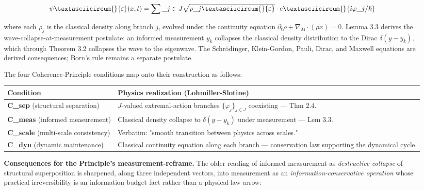 \documentclass[11pt, openany]{book}
\begin{document}
$$
\psi\textasciicircum{}{\varepsilon}(x, t) = \sum\_\allowbreak{}{j \in J} \sqrt{\rho\_\allowbreak{}j\textasciicircum{}{\varepsilon}} \cdot e\textasciicircum{}{i \varphi\_\allowbreak{}j / \hbar}
$$

where each $\rho_j$ is the classical density along branch $j$, evolved under the continuity equation $\partial_t \rho + \nabla_M \cdot (\rho \dot{x}) = 0$. Lemma 3.3 derives the wave-collapse-at-measurement postulate: an informed measurement $y_k$ collapses the classical density distribution to the Dirac $\delta(y - y_k)$, which through Theorem 3.2 collapses the wave to the eigenwave. The Schrödinger, Klein-Gordon, Pauli, Dirac, and Maxwell equations are derived consequences; Born's rule remains a separate postulate.

The four Coherence-Principle conditions map onto their construction as follows:

\begingroup\setlength{\tabcolsep}{3pt}\renewcommand{\arraystretch}{1.15}\footnotesize
\begin{center}
\begin{tabular}{p{1.20in} p{3.19in}}
\toprule
Condition & Physics realization (Lohmiller-Slotine) \\
\midrule
\textbf{C\_\allowbreak{}sep} (structural separation) & $J$-valued extremal-action branches $\{\varphi_j\}_{j \in J}$ coexisting --- Thm 2.4. \\
\textbf{C\_\allowbreak{}meas} (informed measurement) & Classical density collapse to $\delta(y - y_k)$ under measurement --- Lem 3.3. \\
\textbf{C\_\allowbreak{}scale} (multi-scale consistency) & Verbatim: "smooth transition between physics across scales." \\
\textbf{C\_\allowbreak{}dyn} (dynamic maintenance) & Classical continuity equation along each branch --- conservation law supporting the dynamical cycle. \\
\bottomrule
\end{tabular}
\end{center}
\endgroup
\textbf{Consequences for the Principle's measurement-reframe.} The older reading of informed measurement as \textit{destructive collapse} of structural superposition is sharpened, along three independent vectors, into measurement as an \textit{information-conservative operation} whose practical irreversibility is an information-budget fact rather than a physical-law arrow:
\end{document}
